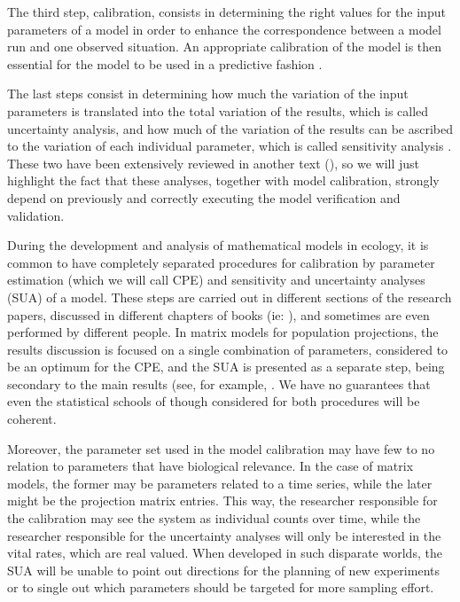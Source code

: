 \documentclass[twoside,12pt,a4paper]{article}
\begin{document}
The third step, calibration, consists in determining the right values for the input parameters of a model
in order to enhance the correspondence between a model run and one observed situation. An appropriate
calibration of the model is then essential for the model to be used in a predictive fashion \citep{ASC2010}.

The last steps consist in determining how much the variation of the input parameters is translated into
the total variation of the results, which is called uncertainty analysis, and how much of the variation
of the results can be ascribed to the variation of each individual parameter, which is called sensitivity
analysis \citep{Helton03, Helton05}. These two have been extensively reviewed in another text 
(\citep{Chalom12}), so we will just highlight the fact that these analyses, together with model calibration,
strongly depend on previously and correctly executing the model verification and validation.

During the development and analysis of mathematical models in ecology, it is common to have completely 
separated procedures for calibration by parameter estimation (which we will call CPE) and 
sensitivity and uncertainty analyses (SUA) of a model. These steps are carried out in different sections of
the research papers, discussed in different chapters of books (ie: \citep{Caswell89}), and sometimes are
even performed by different people. In matrix models for population projections, the results discussion
is focused on a single combination of parameters, considered to be an optimum for the CPE, and the
SUA is presented as a separate step, being secondary to the main results (see, for example, 
\citep{SilvaMatos99}. We have no guarantees that even the statistical schools of though considered for 
both procedures will be coherent.

Moreover, the parameter set used in the model calibration may have few to no relation to parameters that
have biological relevance. In the case of matrix models, the former may be parameters related to a time 
series, while the later might be the projection matrix entries. This way, the researcher responsible for
the calibration may see the system as individual counts over time, while the researcher responsible for 
the uncertainty analyses will only be interested in the vital rates, which are real valued. When developed
in such disparate worlds, the SUA will be unable to point out directions for the planning of new experiments
or to single out which parameters should be targeted for more sampling effort.
\end{document}

